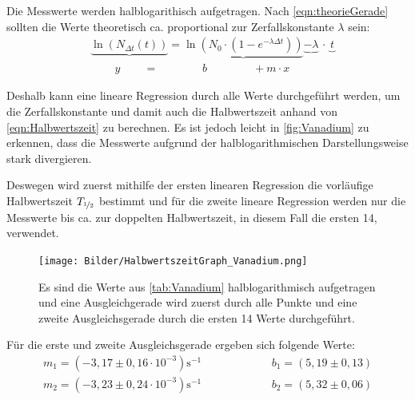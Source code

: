 \documentclass[titlepage = firstcover]{scrartcl}
\begin{document}
            Die Messwerte werden halblogarithisch aufgetragen. Nach \autoref{eqn:theorieGerade} sollten die Werte theoretisch ca. proportional zur Zerfallskonstante $\lambda$ sein:
            \begin{align*}
                &\underbrace{\ln\left(N_{\Delta t}(t)\right)} = \underbrace{\ln \left(N_0 \cdot \left(1 - e^{-\lambda \Delta t}\right)\right)} \underbrace{ - \lambda} \hspace{2pt} \cdot \hspace{3pt} \underbrace{t} \\
                & \hspace{26pt} y \hspace{25pt} = \hspace{47pt} b \hspace{49pt} + m \cdot x
            \end{align*}            

            Deshalb kann eine lineare Regression durch alle Werte durchgeführt werden, um die Zerfallskonstante und damit auch die Halbwertszeit anhand von \autoref{eqn:Halbwertszeit} zu berechnen.
            Es ist jedoch leicht in \autoref{fig:Vanadium} zu erkennen, dass die Messwerte aufgrund der halblogarithmischen Darstellungsweise stark divergieren.

            Deswegen wird zuerst mithilfe der ersten linearen Regression die vorläufige Halbwertszeit $T_{\nicefrac{1}{2}}$ bestimmt und für die zweite lineare Regression werden nur die Messwerte bis ca. zur doppelten Halbwertszeit, in diesem Fall die ersten 14, verwendet.

            \begin{figure}[h]
                \centering
                \texttt{[image: Bilder/HalbwertszeitGraph\_Vanadium.png]}
                \caption{Es sind die Werte aus \autoref{tab:Vanadium} halblogarithmisch aufgetragen und eine Ausgleichgerade wird zuerst durch alle Punkte und eine zweite Ausgleichsgerade durch die ersten 14 Werte durchgeführt.}
                \label{fig:Vanadium}
            \end{figure}
  
            \FloatBarrier

            Für die erste und zweite Ausgleichsgerade ergeben sich folgende Werte:
            \begin{align*}
                m_1 = (-3,17 \pm 0,16 \cdot 10^{-3}) \text{s}^{-1} \hspace{75pt} b_1 = (5,19 \pm 0,13) \\
                m_2 = (-3,23 \pm 0,24 \cdot 10^{-3}) \text{s}^{-1} \hspace{75pt} b_2 = (5,32 \pm 0,06)
            \end{align*}
\end{document}
